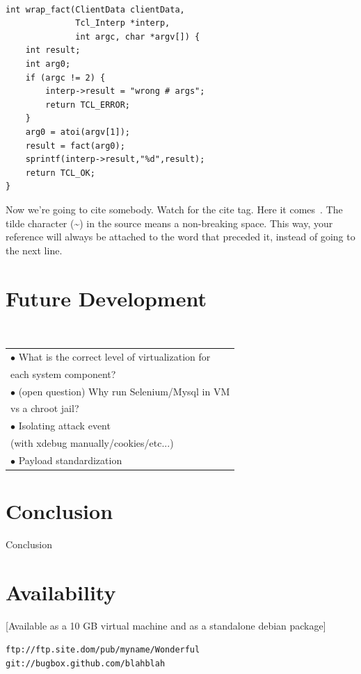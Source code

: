 \documentclass[letterpaper,twocolumn,10pt]{article}
\begin{document}
{\tt \small
\begin{verbatim}
int wrap_fact(ClientData clientData,
              Tcl_Interp *interp,
              int argc, char *argv[]) {
    int result;
    int arg0;
    if (argc != 2) {
        interp->result = "wrong # args";
        return TCL_ERROR;
    }
    arg0 = atoi(argv[1]);
    result = fact(arg0);
    sprintf(interp->result,"%d",result);
    return TCL_OK;
}
\end{verbatim}
}

Now we're going to cite somebody.  Watch for the cite tag.
Here it comes~\cite{Chaum1981,Diffie1976}.  The tilde character (\~{})
in the source means a non-breaking space.  This way, your reference will
always be attached to the word that preceded it, instead of going to the
next line.

\section{Future Development}\\
 \begin{tabular} { l }
   $\bullet$ What is the correct level of virtualization for\\ each system component?\\
   $\bullet$ (open question) Why run Selenium/Mysql in VM\\ vs a chroot jail?\\
   $\bullet$ Isolating attack event \\(with xdebug manually/cookies/etc...)\\
   $\bullet$ Payload standardization
 \end{tabular}


\section{Conclusion}

Conclusion

\section{Availability}

[Available as a 10 GB virtual machine and as a standalone debian package]

\begin{center}
{\tt ftp://ftp.site.dom/pub/myname/Wonderful}\\
{\tt git://bugbox.github.com/blahblah}\\
\end{center}
\end{document}

